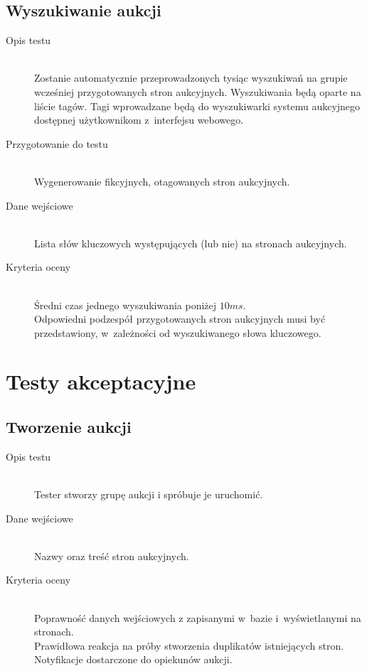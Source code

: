 \documentclass[10pt,a4paper]{article}
\begin{document}
\subsection{Wyszukiwanie aukcji}
\begin{description}
  \item[Opis testu] \hfill \\
    Zostanie automatycznie przeprowadzonych tysiąc wyszukiwań na grupie
    wcześniej przygotowanych stron aukcyjnych. Wyszukiwania będą oparte na
    liście tagów. Tagi wprowadzane będą do wyszukiwarki systemu aukcyjnego
    dostępnej użytkownikom z~interfejsu webowego.
  \item[Przygotowanie do testu] \hfill \\
    Wygenerowanie fikcyjnych, otagowanych stron aukcyjnych.
  \item[Dane wejściowe] \hfill \\
    Lista słów kluczowych występujących (lub nie) na stronach aukcyjnych.
  \item[Kryteria oceny] \hfill \\
    Średni czas jednego wyszukiwania poniżej $10 ms$.\\
    Odpowiedni podzespół przygotowanych stron aukcyjnych musi być
    przedstawiony, w~zależności od wyszukiwanego słowa kluczowego.
\end{description}

\section{Testy akceptacyjne}

\subsection{Tworzenie aukcji}
\begin{description}
  \item[Opis testu] \hfill \\
    Tester stworzy grupę aukcji i spróbuje je uruchomić.
  \item[Dane wejściowe] \hfill \\
    Nazwy oraz treść stron aukcyjnych.
  \item[Kryteria oceny] \hfill \\
    Poprawność danych wejściowych z zapisanymi w~bazie i~wyświetlanymi na
    stronach.\\
    Prawidłowa reakcja na próby stworzenia duplikatów istniejących stron.\\
    Notyfikacje dostarczone do opiekunów aukcji.
\end{description}
\end{document}
